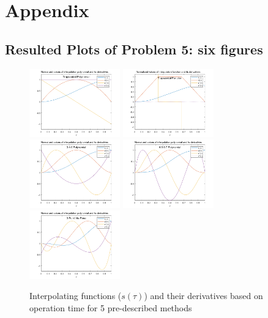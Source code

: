 \documentclass[conference]{IEEEtran}
\begin{document}
\vspace{30px}
\section{Appendix}
\subsection{Resulted Plots of Problem 5: six figures}
\begin{figure}[htbp]
    \centering
    \includegraphics[width=0.35\textwidth]{figures/prob5/s(tau)/1.png}
    \includegraphics[width=0.35\textwidth]{figures/prob5/s(tau)/2.png}
    \includegraphics[width=0.35\textwidth]{figures/prob5/s(tau)/3.png}
    \includegraphics[width=0.35\textwidth]{figures/prob5/s(tau)/4.png}
    \includegraphics[width=0.35\textwidth]{figures/prob5/s(tau)/5.png}
    \caption{Interpolating functions ($s(\tau)$) and their derivatives based on operation time for 5 pre-described methods}
    \label{fig:res1}
\end{figure}
\end{document}
